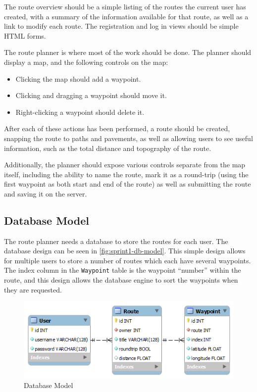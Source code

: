 The route overview should be a simple listing of the routes the current user has created, with a summary of the information available for that route, as well as a link to modify each route. The registration and log in views should be simple \ac{HTML} forms.

The route planner is where most of the work should be done. The planner should display a map, and the following controls on the map:

\begin{itemize}
	\item{Clicking the map should add a waypoint.}
	\item{Clicking and dragging a waypoint should move it.}
	\item{Right-clicking a waypoint should delete it.}
\end{itemize}

After each of these actions has been performed, a route should be created, snapping the route to paths and pavements, as well as allowing users to see useful information, such as the total distance and topography of the route.

Additionally, the planner should expose various controls separate from the map itself, including the ability to name the route, mark it as a round-trip (using the first waypoint as both start and end of the route) as well as submitting the route and saving it on the server.

\subsection{Database Model}

The route planner needs a database to store the routes for each user. The database design can be seen in \autoref{fig:sprint1-db-model}. This simple design allows for multiple users to store a number of routes which each have several waypoints. The index column in the \texttt{Waypoint} table is the waypoint ``number'' within the route, and this design allows the database engine to sort the waypoints when they are requested.

\begin{figure}[!ht]
	\centering
	\includegraphics[scale=0.5]{img/sprint1db.png}
	\caption{Database Model}
	\label{fig:sprint1-db-model}
\end{figure}

